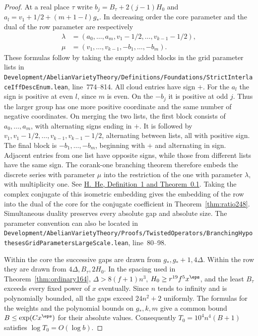 \documentclass[a4paper,11pt]{article}
\theoremstyle{definition}
\theoremstyle{remark}
\newcommand{\srcloc}[2]{{\small\nolinkurl{#1.lean}}, line~#2}
\numberwithin{equation}{section}
\begin{document}
\begin{proof}
At a real place \(\tau\) write \(b_j=B_\tau+2(j-1)H_0\) and
\(a_l=v_1+1/2+(m+1-l)g_*\). In decreasing order the core parameter
and the dual of the row parameter are respectively
\[
 \begin{aligned}
 \lambda&=(a_0,\ldots,a_m, v_1-1/2,\ldots,v_{k-1}-1/2),\\
 \mu&=(v_1,\ldots,v_{k-1},-b_1,\ldots,-b_m).
 \end{aligned}
\]
These formulas follow by taking the empty added blocks in the grid
parameter lists in
\srcloc{Development/AbelianVarietyTheory/Definitions/Foundations/StrictInterlaceIffDescEnum}{774--814}.
All cloud entries have sign \(+\). For the \(a_l\) the sign is positive
at even \(l\), since \(m\) is even. On the \(-b_j\) it is positive
at odd \(j\). Thus the larger group has one more positive coordinate
and the same number of negative coordinates. On merging the two lists,
the first block consists of \(a_0,\ldots,a_m\), with alternating
signs ending in \(+\). It is followed by \(v_1,v_1-1/2,\ldots,
v_{k-1},v_{k-1}-1/2\), alternating between lists, all with positive
sign. The final block is \(-b_1,\ldots,-b_m\), beginning with \(+\)
and alternating in sign. Adjacent entries from one list have opposite
signs, while those from different lists have the same sign. The corank-one
branching theorem therefore embeds the discrete series with parameter
\(\mu\) into the restriction of the one with parameter \(\lambda\),
with multiplicity one. See \href{https://arxiv.org/abs/1508.02032}{H.~He,
Definition~1 and Theorem~0.1}. Taking the complex conjugate of this
isometric embedding gives the embedding of the row into the dual of the
core for the conjugate coefficient in Theorem~\ref{thm:ratio248}.
Simultaneous duality preserves every absolute gap and absolute size.
The parameter convention can also be located in
\srcloc{Development/AbelianVarietyTheory/Proofs/TwistedOperators/BranchingHypothesesGridParametersLargeScale}{80--98}.

Within the core the successive gaps are drawn from
\(g_*,g_*+1,4\Delta\). Within the row they are drawn from
\(4\Delta,B_\tau,2H_0\). In the spacing used in
Theorem~\ref{thm:ordinary164}, \(\Delta>8(f+1)n^3\),
\(H_0\ge r^{19}f^5x^\eps\), and the least \(B_\tau\) exceeds
every fixed power of \(x\) eventually. Since \(n\) tends to infinity
and is polynomially bounded, all the gaps exceed \(24n^2+2\) uniformly.
The formulas for the weights and the polynomial bounds on \(g_*,k,m\)
give a common bound \(B\le\exp(C x^\eps)\) for their absolute values.
Consequently \(T_0=10^4 n^4(B+1)\) satisfies \(\log T_0=O(\log b)\).


\end{proof}
\end{document}
